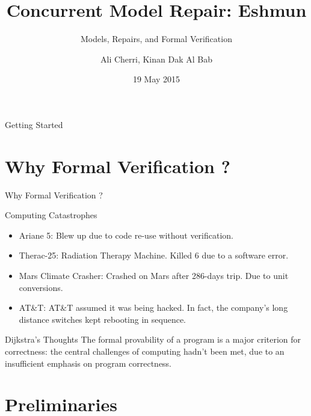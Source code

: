 \documentclass{bredelebeamer}
\title[Eshmun]{Concurrent Model Repair: Eshmun}
\subtitle{Models, Repairs, and Formal Verification}
\author{Ali Cherri\inst{1}, Kinan Dak Al Bab\inst{1}}
\institute[AUB]
{
  \inst{1}%
  American University of Beirut\\
  Department of Computer Science
  }
\date{19 May 2015}
\begin{document}
\begin{frame}
  \titlepage
\end{frame}


\begin{frame}{Getting Started}
  \tableofcontents
\end{frame}

\section{Why Formal Verification ?}

\begin{frame}{Why Formal Verification ?}
\begin{block}{Computing Catastrophes\citep{bugs}}
\begin{itemize}
\item \alert{Ariane 5}: Blew up due to code re-use without verification.
\item \alert{Therac-25}: Radiation Therapy Machine. Killed 6 due to a software error.
\item \alert{Mars Climate Crasher}: Crashed on Mars after 286-days trip. Due to unit conversions.
\item \alert{AT\&T}: AT\&T assumed it was being hacked. In fact, the company's long distance switches kept rebooting in sequence.

\end{itemize}
\end{block}

\begin{block}{Dijkstra's Thoughts\citep{dijkstra}}
The formal provability of a program is a major criterion for correctness: the central challenges of computing hadn’t been met, due to an insufficient emphasis on program correctness.
\end{block}

\end{frame}

\section{Preliminaries}
\end{document}
